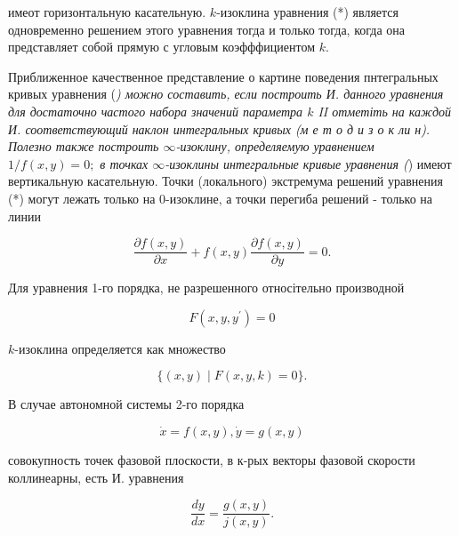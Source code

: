 \documentclass[10pt]{article}
\begin{document}
имеот горизонтальную касательную. $k$-изоклина уравнения (*) является одновременно решением этого уравнения тогда и только тогда, когда она представляет собой прямую с угловым коэфффициентом $k$.



Приближенное качественное представление о картине поведения пнтегральных кривых уравнения (\textit{) можно составить, если построить И. данного уравнения для достаточно частого набора значений параметра $k$ II отметіть на каждой И. соответствующий наклон интегральных кривых (м е т о д и з о к ли н). Полезно также построить $\infty$-изоклину, определяемую уравнением $1 / f(x, y)=0 ;$ в точках $\infty$-изоклины интегральные кривые уравнения (}) имеют вертикальную касательную. Точки (локального) экстремума решений уравнения (*) могут лежать только на 0-изоклине, а точки перегиба решений - только на линии



\[

\frac{\partial f(x, y)}{\partial x}+f(x, y) \frac{\partial f(x, y)}{\partial y}=0 .

\]



Для уравнения 1-го порядка, не разрешенного относітельно производной



\[

F\left(x, y, y^{\prime}\right)=0

\]



$k$-изоклина определяется как множество



\[

\{(x, y) \mid F(x, y, k)=0\} .

\]



В случае автономной системы 2-го порядка



\[

\dot{x}=f(x, y), \dot{y}=g(x, y)

\]



совокупность точек фазовой плоскости, в к-рых векторы фазовой скорости коллинеарны, есть И. уравнения



\[

\frac{d y}{d x}=\frac{g(x, y)}{j(x, y)} .

\]
\end{document}
